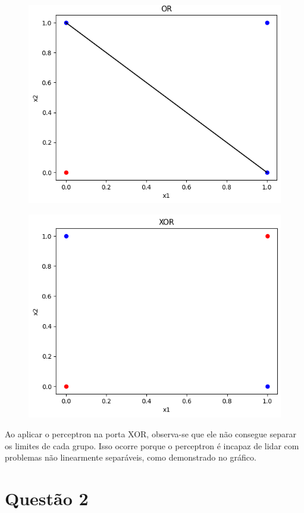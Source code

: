 \documentclass[12pt]{article}
\begin{document}
\begin{figure}[ht]
	\centering
	\includegraphics[width=.8\textwidth]{image5.png}
\end{figure}

\begin{figure}[ht]
	\centering
	\includegraphics[width=.8\textwidth]{image6.png}
\end{figure}

Ao aplicar o perceptron na porta XOR, observa-se que ele não consegue separar os limites de cada grupo. Isso ocorre porque o perceptron é incapaz de lidar com problemas não linearmente separáveis, como demonstrado no gráfico.

\section*{Questão 2}
\end{document}

